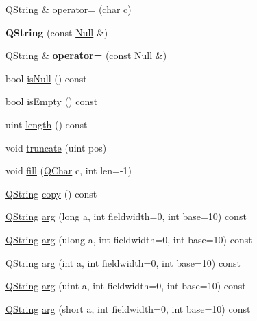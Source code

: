 \begin{DoxyCompactItemize}
\item 
\mbox{\hyperlink{class_q_string}{Q\+String}} \& \mbox{\hyperlink{class_q_string_a8de95eb7bffbe1a58c5fb586192066e1}{operator=}} (char c)
\item 
\mbox{\label{class_q_string_a8f4ed13204d5e42853176c0116a6e098}} 
{\bfseries Q\+String} (const \mbox{\hyperlink{struct_q_string_1_1_null}{Null}} \&)
\item 
\mbox{\label{class_q_string_a70791ce01404480adbac0c524c3bd90a}} 
\mbox{\hyperlink{class_q_string}{Q\+String}} \& {\bfseries operator=} (const \mbox{\hyperlink{struct_q_string_1_1_null}{Null}} \&)
\item 
bool \mbox{\hyperlink{class_q_string_a6a6da156364a32ef91e35f83b1955acc}{is\+Null}} () const
\item 
bool \mbox{\hyperlink{class_q_string_aa032d4b5892338beb575a85e59bbbf38}{is\+Empty}} () const
\item 
uint \mbox{\hyperlink{class_q_string_ac431a733d01111059c8364c62ed53270}{length}} () const
\item 
void \mbox{\hyperlink{class_q_string_a6a7546dfb7ad7b0e5d982078c03595db}{truncate}} (uint pos)
\item 
void \mbox{\hyperlink{class_q_string_a261151b9ce7096b9af4a9588bb5d038a}{fill}} (\mbox{\hyperlink{class_q_char}{Q\+Char}} c, int len=-\/1)
\item 
\mbox{\hyperlink{class_q_string}{Q\+String}} \mbox{\hyperlink{class_q_string_a235ce7da570a43b49839a1cd00c91936}{copy}} () const
\item 
\mbox{\hyperlink{class_q_string}{Q\+String}} \mbox{\hyperlink{class_q_string_a16bc2c0a1d3e66872697a0d772aac0cf}{arg}} (long a, int fieldwidth=0, int base=10) const
\item 
\mbox{\hyperlink{class_q_string}{Q\+String}} \mbox{\hyperlink{class_q_string_af1d2de1335207cb1999634fa8cd98141}{arg}} (ulong a, int fieldwidth=0, int base=10) const
\item 
\mbox{\hyperlink{class_q_string}{Q\+String}} \mbox{\hyperlink{class_q_string_a6c3b33e3eb30057769fb89490a20de5e}{arg}} (int a, int fieldwidth=0, int base=10) const
\item 
\mbox{\hyperlink{class_q_string}{Q\+String}} \mbox{\hyperlink{class_q_string_a9ba06d783305c502518f516e035788d1}{arg}} (uint a, int fieldwidth=0, int base=10) const
\item 
\mbox{\hyperlink{class_q_string}{Q\+String}} \mbox{\hyperlink{class_q_string_a96b851d9db810c260225311bd1a1f1dc}{arg}} (short a, int fieldwidth=0, int base=10) const

\end{DoxyCompactItemize}
